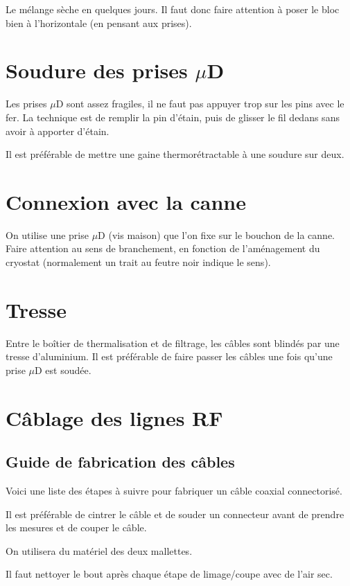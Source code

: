 \documentclass[a4paper,11pt]{article}
\newcommand{\uD}{$\mu$D }
\begin{document}
Le mélange sèche en quelques jours. Il faut donc faire attention à poser le bloc bien à l'horizontale (en pensant aux prises).

\section{Soudure des prises \uD}
Les prises \uD sont assez fragiles, il ne faut pas appuyer trop sur les pins avec le fer. La technique est de remplir la pin d'étain, puis de glisser le fil dedans sans avoir à apporter d'étain.

Il est préférable de mettre une gaine thermorétractable à une soudure sur deux.

\section{Connexion avec la canne}
On utilise une prise \uD (vis maison) que l'on fixe sur le bouchon de la canne. Faire attention au sens de branchement, en fonction de l'aménagement du cryostat (normalement un trait au feutre noir indique le sens).

\section{Tresse}
Entre le boîtier de thermalisation et de filtrage, les câbles sont blindés par une tresse d'aluminium. Il est préférable de faire passer les câbles une fois qu'une prise \uD est soudée.

\section{Câblage des lignes RF}
\subsection{Guide de fabrication des câbles}
Voici une liste des étapes à suivre pour fabriquer un câble coaxial connectorisé.

Il est préférable de cintrer le câble et de souder un connecteur avant de prendre les mesures et de couper le câble.

On utilisera du matériel des deux mallettes.

Il faut nettoyer le bout après chaque étape de limage/coupe avec de l'air sec.
\end{document}
